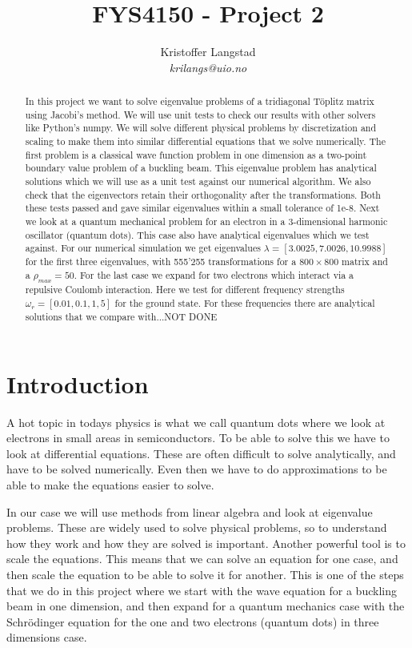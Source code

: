 \documentclass[12pt,a4paper,english]{article}
\title{FYS4150 - Project 2}
\date{}
\author{ Kristoffer Langstad\\ \textit{krilangs@uio.no}}
\begin{document}
\maketitle
\begin{abstract}
In this project we want to solve eigenvalue problems of a tridiagonal Töplitz matrix using Jacobi's method. We will use unit tests to check our results with other solvers like Python's numpy. We will solve different physical problems by discretization and scaling to make them into similar differential equations that we solve numerically. The first problem is a classical wave function problem in one dimension as a two-point boundary value problem of a buckling beam. This eigenvalue problem has analytical solutions which we will use as a unit test against our numerical algorithm. We also check that the eigenvectors retain their orthogonality after the transformations. Both these tests passed and gave similar eigenvalues within a small tolerance of 1e-8. Next we look at a quantum mechanical problem for an electron in a 3-dimensional harmonic oscillator (quantum dots). This case also have analytical eigenvalues which we test against. For our numerical simulation we get eigenvalues $\lambda=[3.0025, 7.0026, 10.9988]$ for the first three eigenvalues, with 555'255 transformations for a $800\times800$ matrix and a $\rho_{max}=50$. For the last case we expand for two electrons which interact via a repulsive Coulomb interaction. Here we test for different frequency strengths $\omega_r=[0.01, 0.1, 1, 5]$ for the ground state. For these frequencies there are analytical solutions that we compare with...NOT DONE
\end{abstract}

\section{Introduction}
A hot topic in todays physics is what we call quantum dots where we look at electrons in small areas in semiconductors. To be able to solve this we have to look at differential equations. These are often difficult to solve analytically, and have to be solved numerically. Even then we have to do approximations to be able to make the equations easier to solve.

In our case we will use methods from linear algebra and look at eigenvalue problems. These are widely used to solve physical problems, so to understand how they work and how they are solved is important. Another powerful tool is to scale the equations. This means that we can solve an equation for one case, and then scale the equation to be able to solve it for another. This is one of the steps that we do in this project where we start with the wave equation for a buckling beam in one dimension, and then expand for a quantum mechanics case with the Schrödinger equation for the one and two electrons (quantum dots) in three dimensions case.
\end{document}
